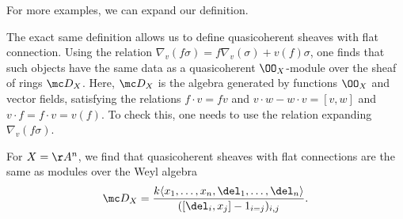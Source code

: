 \documentclass[../notes.tex]{subfiles}
\begin{document}
For more examples, we can expand our definition.
\begin{remark}
	The exact same definition allows us to define quasicoherent sheaves with flat connection. Using the relation $\nabla_v(f\sigma)=f\nabla_v(\sigma)+v(f)\sigma$, one finds that such objects have the same data as a quasicoherent $\OO_X$-module over the sheaf of rings $\mc D_X$. Here, $\mc D_X$ is the algebra generated by functions $\OO_X$ and vector fields, satisfying the relations $f\cdot v=fv$ and $v\cdot w-w\cdot v=[v,w]$ and $v\cdot f=f\cdot v=v(f)$. To check this, one needs to use the relation expanding $\nabla_v(f\sigma)$.
\end{remark}
\begin{example}
	For $X=\AA^n$, we find that quasicoherent sheaves with flat connections are the same as modules over the Weyl algebra
	\[\mc D_X=\frac{k\langle x_1,\ldots,x_n,\del_1,\ldots,\del_n\rangle}{([\del_i,x_j]-1_{i=j})_{i,j}}.\]
\end{example}
\end{document}
